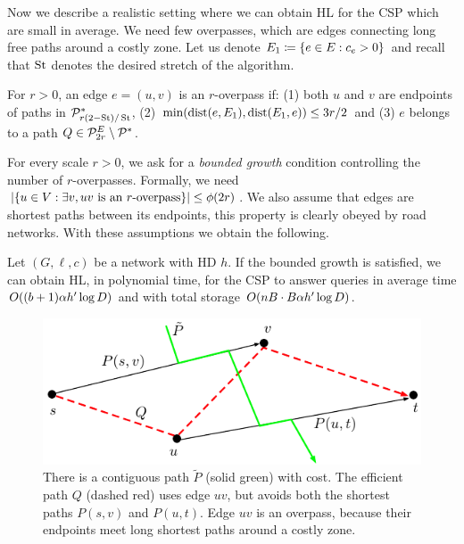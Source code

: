 Now we describe a realistic setting where we can obtain HL for the CSP which are small in average.
We need few overpasses, which are edges connecting long free paths around a costly zone.
Let us denote $E_1\coloneqq\{e\in E:c_e>0\}$ and recall that $\operatorname{St}$ denotes the desired stretch of the algorithm.

\begin{definition}[Overpass]
For $r>0$, an edge $e=(u,v)$ is an $r$-overpass if: (1) both $u$ and $v$ are endpoints of paths in $\mathcal{P}^*_{r(2-\operatorname{St})/\operatorname{St}}$, (2) $\min(\mbox{dist}(e,E_1),\mbox{dist}(E_1,e))\leq 3r/2$ and (3) $e$ belongs to a path $Q\in\mathcal{P}^E_{2r}\setminus\mathcal{P}^*$.
\end{definition} 

For every scale $r>0$, we ask for a \emph{bounded growth} condition controlling the number of $r$-overpasses.
Formally, we need $\lvert\{u\in V: \exists v, uv \text{ is an $r$-overpass}\}\rvert\leq \phi(2r)$.
We also assume that edges are shortest paths between its endpoints, this property is clearly obeyed by road networks.
With these assumptions we obtain the following.

\begin{theorem}\label{theo:overpasses}
Let $(G,\ell,c)$ be a network with HD $h$.
If the bounded growth is satisfied, we can obtain HL, in polynomial time, for the CSP to answer queries in average time $O((b+1)\alpha h'\log D)$ and with total storage $O(nB\cdot B\alpha h'\log D)$.
\end{theorem}

\begin{figure}
\includegraphics[scale=0.7]{TexImg/overpass.pdf}
\caption{There is a contiguous path $\tilde P$ (solid green) with cost. 
The efficient path $Q$ (dashed red) uses edge $uv$, but avoids both the shortest paths $P(s,v)$ and $P(u,t)$.
Edge $uv$ is an overpass, because their endpoints meet long shortest paths around a costly zone.}
\label{fig:overpass}
\end{figure}

